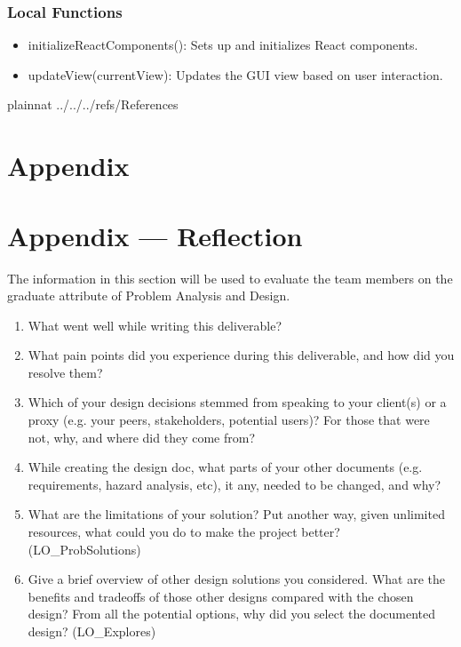 \documentclass[12pt, titlepage]{article}
\begin{document}
\subsubsection{Local Functions}

\begin{itemize}
  \item initializeReactComponents(): Sets up and initializes React components.
  \item updateView(currentView): Updates the GUI view based on user interaction.
\end{itemize}

\newpage

 {plainnat}
 {../../../refs/References}

\newpage

\section{Appendix} \label{Appendix}


\newpage{}

\section*{Appendix --- Reflection}


The information in this section will be used to evaluate the team members on the
graduate attribute of Problem Analysis and Design.



\begin{enumerate}
  \item What went well while writing this deliverable? 
  \item What pain points did you experience during this deliverable, and how
    did you resolve them?
  \item Which of your design decisions stemmed from speaking to your client(s)
  or a proxy (e.g. your peers, stakeholders, potential users)? For those that
  were not, why, and where did they come from?
  \item While creating the design doc, what parts of your other documents (e.g.
  requirements, hazard analysis, etc), it any, needed to be changed, and why?
  \item What are the limitations of your solution?  Put another way, given
  unlimited resources, what could you do to make the project better? (LO\_ProbSolutions)
  \item Give a brief overview of other design solutions you considered.  What
  are the benefits and tradeoffs of those other designs compared with the chosen
  design?  From all the potential options, why did you select the documented design?
  (LO\_Explores)
\end{enumerate}
\end{document}
